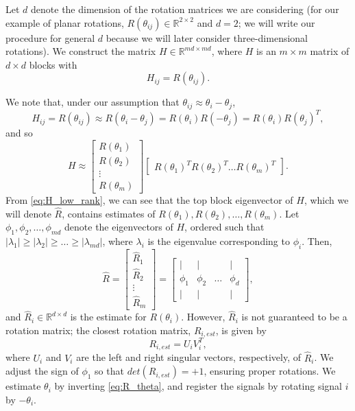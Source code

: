 \documentclass{pnastwo}
\begin{document}
\begin{article}
\begin{materials}
Let $d$ denote the dimension of the rotation matrices we are considering (for our example of planar rotations, $R(\theta_{ij}) \in \mathbb{R}^{2 \times 2}$ and $d=2$; we will write our procedure for general $d$ because we will later consider three-dimensional rotations).
%
We construct the matrix $H \in \mathbb{R}^{md \times md}$, where $H$ is an $m \times m$ matrix of $d \times d$ blocks with
\begin{equation} \label{eq:H_to_R}
H_{ij} = R(\theta_{ij}).
\end{equation}
%

We note that, under our assumption that $\theta_{ij} \approx \theta_i - \theta_j$, 
\begin{equation} 
H_{ij} = R(\theta_{ij}) \approx R(\theta_i - \theta_j) = R(\theta_i) R(-\theta_j) = R(\theta_i) R(\theta_j)^T,
\end{equation}
 and so
\begin{equation} \label{eq:H_low_rank}
	H \approx 
	\begin{bmatrix}
	R(\theta_1) \\
	R(\theta_2) \\
	\vdots \\
	R(\theta_m)
	\end{bmatrix}
	\begin{bmatrix}
	R(\theta_1)^T R(\theta_2)^T \dots R(\theta_m)^T
	\end{bmatrix}.
\end{equation}
%
From \eqref{eq:H_low_rank}, we can see that the top block eigenvector of $H$, which we will denote $\hat{R}$, contains estimates of $R(\theta_1), R(\theta_2), \dots, R(\theta_m)$.
%
Let $\phi_1, \phi_2, \dots, \phi_{md}$ denote the eigenvectors of $H$, ordered such that $|\lambda_1| \ge |\lambda_2| \ge \dots \ge |\lambda_{md}|$, where $\lambda_i$ is the eigenvalue corresponding to $\phi_i$. 
%
Then,
\begin{equation}
\hat{R} = 
\begin{bmatrix}
\hat{R}_1 \\
\hat{R}_2 \\
\vdots \\
\hat{R}_m
\end{bmatrix} =
\begin{bmatrix}
| & | & & | \\
\phi_1 & \phi_2 & \dots & \phi_d \\
| & | & & | 
\end{bmatrix},
\end{equation}
and $\hat{R}_i \in \mathbb{R}^{d \times d}$ is the estimate for $R(\theta_i)$. 
%
However, $\hat{R}_i$ is not guaranteed to be a rotation matrix; the closest rotation matrix, $R_{i, est}$, is given by
\begin{equation} \label{eq:R_est}
R_{i, est} = U_i V_i^T, 
\end{equation} 
where $U_i$ and $V_i$ are the left and right singular vectors, respectively, of $\hat{R}_i$.
%
We adjust the sign of $\phi_1$ so that $det(R_{i, est}) = +1$, ensuring proper rotations.
%
We estimate $\theta_{i}$ by inverting \eqref{eq:R_theta}, and register the signals by rotating signal $i$ by $-\theta_i$. 


\end{materials}
\end{article}
\end{document}
